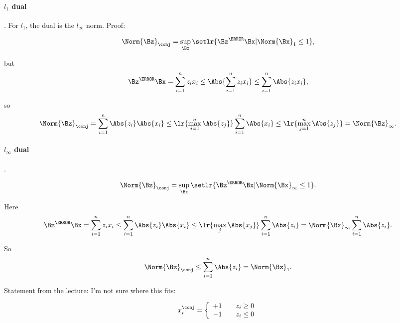 \paragraph{\( l_1 \) dual}.
For \( l_1 \), the dual is the \( l_\infty \) norm.  Proof:

\begin{equation}\label{eqn:convex-optimizationLecture2:184}
\Norm{\Bz}_\conj
=
\sup_\Bx \setlr{ \Bz^\T \Bx | \Norm{\Bx}_1 \le 1 },
\end{equation}

but
\begin{dmath}\label{eqn:convex-optimizationLecture2:204}
\Bz^\T \Bx
=
\sum_{i=1}^n z_i x_i \le
\Abs{
\sum_{i=1}^n z_i x_i
}
\le
\sum_{i=1}^n \Abs{z_i x_i },
\end{dmath}

so
\begin{dmath}\label{eqn:convex-optimizationLecture2:224}
\Norm{\Bz}_\conj
=
\sum_{i=1}^n \Abs{z_i}\Abs{ x_i }
\le \lr{ \max_{j=1}^n \Abs{z_j} }
\sum_{i=1}^n \Abs{ x_i }
\le \lr{ \max_{j=1}^n \Abs{z_j} }
=
\Norm{\Bz}_\infty.
\end{dmath}


\paragraph{\( l_\infty \) dual}.


\begin{equation}\label{eqn:convex-optimizationLecture2:244}
\Norm{\Bz}_\conj
=
\sup_\Bx \setlr{ \Bz^\T \Bx | \Norm{\Bx}_\infty \le 1 }.
\end{equation}

Here
\begin{dmath}\label{eqn:convex-optimizationLecture2:264}
\Bz^\T \Bx
=
\sum_{i=1}^n z_i x_i
\le
\sum_{i=1}^n \Abs{z_i}\Abs{ x_i }
\le
\lr{ \max_j \Abs{ x_j } }
\sum_{i=1}^n \Abs{z_i}
=
\Norm{\Bx}_\infty
\sum_{i=1}^n \Abs{z_i}.
\end{dmath}

So
\begin{equation}\label{eqn:convex-optimizationLecture2:284}
\Norm{\Bz}_\conj
\le
\sum_{i=1}^n \Abs{z_i}
=
\Norm{\Bz}_1.
\end{equation}

Statement from the lecture: I'm not sure where this fits:

\begin{dmath}\label{eqn:convex-optimizationLecture2:304}
x_i^\conj
=
\left\{
\begin{array}{l l}
+1 & \quad \mbox{\( z_i \ge 0 \)} \\
-1 & \quad \mbox{\( z_i \le 0 \)}
\end{array}
\right.
\end{dmath}

\EndArticle
